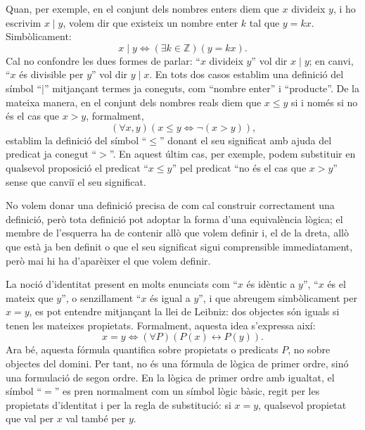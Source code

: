 Quan, per exemple, en el conjunt dels nombres enters diem que $x$ divideix
$y$, i ho escrivim $x\mid y$, volem dir que existeix un nombre enter $k$ tal
que $y=kx$. Simbòlicament:
\begin{equation*}
x\mid y\Longleftrightarrow\left(\exists k\in\mathbb{Z}\right)\left(y=kx\right).
\end{equation*}
Cal no confondre les dues formes de parlar: \enquote{$x$ divideix $y$} vol dir
$x\mid y$; en canvi, \enquote{$x$ és divisible per $y$} vol dir $y\mid x$. En tots
dos casos establim una definició del símbol \enquote{$\mid$} mitjançant termes ja
coneguts, com \enquote{nombre enter} i \enquote{producte}. De la mateixa manera, en el
conjunt dels nombres reals diem que $x\leq y$ si i només si no és el cas que
$x>y$, formalment,
\begin{equation*}
\left( \forall x,y\right) \left( x\leq y\Longleftrightarrow\lnot\left(
x>y\right) \right) \text{,}
\end{equation*}
establim la definició del símbol \enquote{$\leq$} donant el seu significat amb ajuda
del predicat ja conegut \enquote{$>$}. En aquest últim cas, per exemple, podem
substituir en qualsevol proposició el predicat \enquote{$x\leq y$} pel predicat \enquote{no
és el cas que $x>y$} sense que canviï el seu significat.

\bigskip

No volem donar una definició precisa de com cal construir correctament
una definició, però tota definició pot adoptar la forma d'una
equivalència lògica; el membre de l'esquerra ha de contenir allò
que volem definir i, el de la dreta, allò que està ja ben definit o
que el seu significat sigui comprensible immediatament, però mai hi ha
d'aparèixer el que volem definir.

\bigskip

La noció d'identitat present en molts enunciats com \enquote{$x$ és idèntic a
$y$}, \enquote{$x$ és el mateix que $y$}, o senzillament \enquote{$x$ és igual a $y$}, i que
abreugem simbòlicament per $x=y$, es pot entendre mitjançant la llei de
Leibniz: dos objectes són iguals si tenen les mateixes propietats.
Formalment, aquesta idea s'expressa així:
\begin{equation*}
x=y\Longleftrightarrow\left( \forall P\right) \left( P(x)\longleftrightarrow
P(y)\right).
\end{equation*}
Ara bé, aquesta fórmula quantifica sobre propietats o predicats $P$, no sobre
objectes del domini. Per tant, no és una fórmula de lògica de primer ordre,
sinó una formulació de segon ordre. En la lògica de primer ordre amb igualtat,
el símbol \enquote{$=$} es pren normalment com un símbol lògic bàsic, regit per les
propietats d'identitat i per la regla de substitució: si $x=y$, qualsevol
propietat que val per $x$ val també per $y$.

